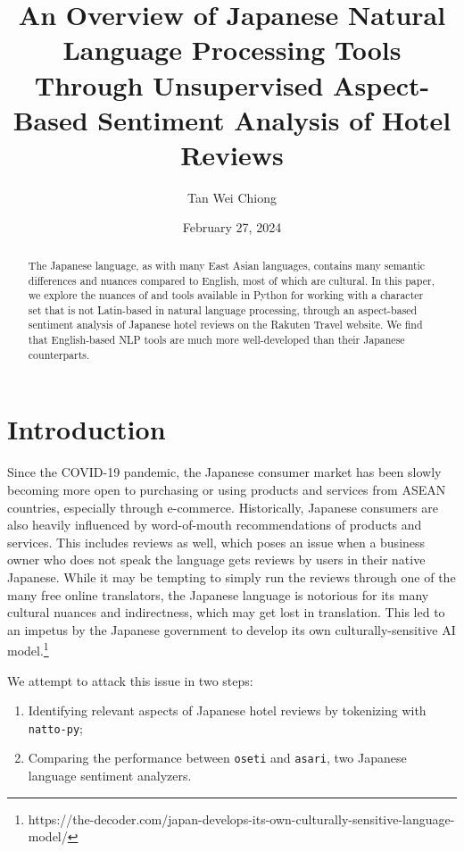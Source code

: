 \documentclass[12pt]{article}
\title{An Overview of Japanese Natural Language Processing Tools Through Unsupervised Aspect-Based Sentiment Analysis of Hotel Reviews}
\author{Tan Wei Chiong}
\date{February 27, 2024}
\begin{document}
	\maketitle
	\tableofcontents
	\newpage
	\begin{abstract}
		The Japanese language, as with many East Asian languages, contains many semantic differences and nuances compared to English, most of which are cultural. In this paper, we explore the nuances of and tools available in Python for working with a character set that is not Latin-based in natural language processing, through an aspect-based sentiment analysis of Japanese hotel reviews on the Rakuten Travel website. We find that English-based NLP tools are much more well-developed than their Japanese counterparts. 
	\end{abstract}
	
	\section{Introduction}
	Since the COVID-19 pandemic, the Japanese consumer market has been slowly becoming more open to purchasing or using products and services from ASEAN countries, especially through e-commerce. Historically, Japanese consumers are also heavily influenced by word-of-mouth recommendations of products and services.\cite{japanese-consumer-market} This includes reviews as well, which poses an issue when a business owner who does not speak the language gets reviews by users in their native Japanese. While it may be tempting to simply run the reviews through one of the many free online translators, the Japanese language is notorious for its many cultural nuances and indirectness, which may get lost in translation. This led to an impetus by the Japanese government to develop its own culturally-sensitive AI model.\footnote{https://the-decoder.com/japan-develops-its-own-culturally-sensitive-language-model/}
	
	We attempt to attack this issue in two steps: \begin{enumerate}
		\item Identifying relevant aspects of Japanese hotel reviews by tokenizing with \verb*|natto-py|;
		\item Comparing the performance between \verb*|oseti| and \verb*|asari|, two Japanese language sentiment analyzers.
	\end{enumerate} 
	
\end{document}
